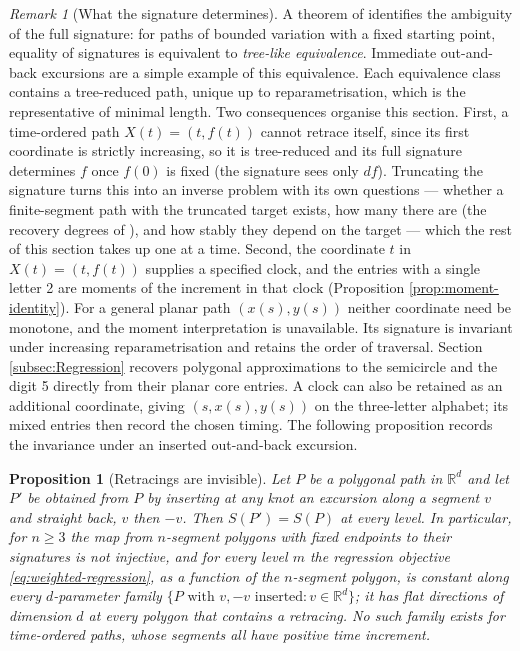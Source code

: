 \documentclass[11pt,english]{article}
\newtheorem{proposition}[theorem]{Proposition}
\theoremstyle{definition}
\theoremstyle{remark}
\newtheorem{remark}[theorem]{Remark}
\begin{document}
\begin{remark}[What the signature determines]
\label{rem:treelike}
A theorem of \cite{HamblyLyons} identifies the ambiguity of the full
signature: for paths of bounded variation with a fixed starting point,
equality of signatures is equivalent to \emph{tree-like equivalence}.
Immediate out-and-back excursions are a simple example of this
equivalence. Each
equivalence class contains a tree-reduced path, unique up to
reparametrisation, which is the representative of minimal length. Two consequences organise this
section. First, a time-ordered path $X(t)=(t,f(t))$ cannot retrace
itself, since its first coordinate is strictly increasing, so it is
tree-reduced and its full signature determines $f$ once $f(0)$ is
fixed (the signature sees only $df$). Truncating the signature turns
this into an inverse problem with its own questions --- whether a
finite-segment path with the truncated target exists, how many there
are (the recovery degrees of \cite{splines}), and how stably they
depend on the target --- which the rest of this section takes up
one at a time. Second, the coordinate $t$ in $X(t)=(t,f(t))$ supplies
a specified clock, and the entries with a single letter 2 are moments
of the increment in that clock (Proposition
\ref{prop:moment-identity}). For a general planar path $(x(s),y(s))$
neither coordinate need be monotone, and the moment interpretation is
unavailable. Its signature is invariant under increasing
reparametrisation \cite{Primer} and retains the order of traversal.
Section \ref{subsec:Regression} recovers polygonal approximations to
the semicircle and the digit 5 directly from their planar core
entries. A clock can also be retained as an additional coordinate,
giving $(s,x(s),y(s))$ on the three-letter alphabet; its mixed entries
then record the chosen timing. The following proposition records the
invariance under an inserted out-and-back excursion.
\end{remark}

\begin{proposition}[Retracings are invisible]
\label{prop:retracing}
Let $P$ be a polygonal path in $\mathbb{R}^{d}$ and let $P'$ be obtained
from $P$ by inserting at any knot an excursion along a segment $v$ and
straight back, $v$ then $-v$. Then $S(P')=S(P)$ at every level. In
particular, for $n\geq3$ the map from $n$-segment polygons with fixed
endpoints to their signatures is not injective, and for every level $m$
the regression objective \eqref{eq:weighted-regression}, as a function
of the $n$-segment polygon, is constant along every $d$-parameter
family $\{P\text{ with }v,-v\text{ inserted}:v\in\mathbb{R}^{d}\}$; it
has flat directions of dimension $d$ at every polygon that contains a
retracing. No such family exists for time-ordered paths, whose segments
all have positive time increment.
\end{proposition}
\end{document}
